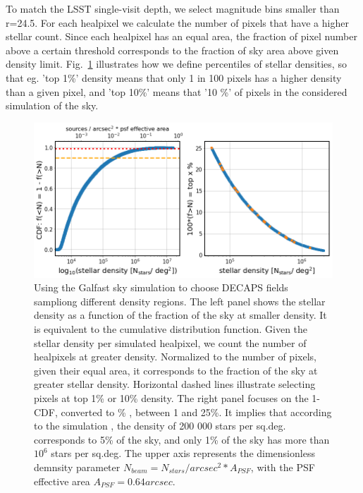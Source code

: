 \documentclass[DM,lsstdraft,toc,usenatbib]{lsstdoc}
\begin{document}
To match the LSST single-visit depth,  we select magnitude bins smaller than r=24.5.   For each healpixel we calculate the number of pixels that have a higher stellar count.  Since each healpixel has an equal area, the fraction of pixel number above a certain threshold corresponds to the fraction of sky area above given density limit.  Fig.~\ref{fig:illustrate_density} illustrates how we define percentiles of stellar densities, so that eg. 'top 1\%' density means that only 1 in 100 pixels has a higher density than a given pixel, and 'top 10\%' means that '10 \%' of pixels in the considered simulation of the sky. 

\begin{figure}
\centering
\includegraphics[width=0.95\columnwidth]{figs/MAF_density_definitions.png}
\caption{Using the Galfast sky simulation to choose DECAPS fields sampliong different density regions.  The left panel shows  the stellar density as a function of the fraction of the sky at smaller density.  It is equivalent to the cumulative distribution function. Given the stellar density per simulated healpixel, we count the number of healpixels at greater density. Normalized to the number of pixels, given their equal area, it corresponds to the fraction of the sky at greater stellar density. Horizontal dashed lines illustrate selecting pixels at top 1\% or 10\% density. 
The right panel focuses on the 1-CDF, converted to \% , between 1 and 25\%.  
It implies that according to the simulation , the density of 200 000 stars per sq.deg. corresponds to 5\% of the sky, and only  1\% of the sky has more than $10^{6}$ stars per sq.deg. 
The upper axis represents the dimensionless demnsity parameter $N_{beam} = N_{stars}/{arcsec}^{2} * A_{PSF}$, with the PSF effective area $A_{PSF} = 0.64 {arcsec}$.}
\label{fig:illustrate_density}
\end{figure} 
\end{document}
